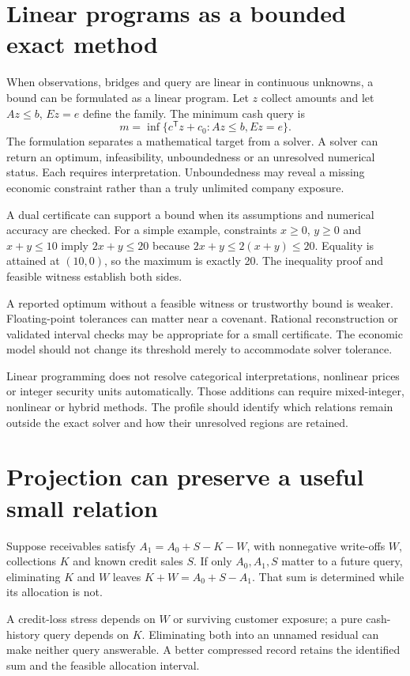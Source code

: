 \section{Linear programs as a bounded exact method}
When observations, bridges and query are linear in continuous unknowns, a bound can be formulated as a linear program. Let $z$ collect amounts and let $Az\leq b$, $Ez=e$ define the family. The minimum cash query is
\begin{equation}
 m=\inf\{c^{\mathsf T}z+c_0:Az\leq b, Ez=e\}.
\end{equation}
The formulation separates a mathematical target from a solver. A solver can return an optimum, infeasibility, unboundedness or an unresolved numerical status. Each requires interpretation. Unboundedness may reveal a missing economic constraint rather than a truly unlimited company exposure.

A dual certificate can support a bound when its assumptions and numerical accuracy are checked. For a simple example, constraints $x\geq0$, $y\geq0$ and $x+y\leq10$ imply $2x+y\leq20$ because $2x+y\leq2(x+y)\leq20$. Equality is attained at $(10,0)$, so the maximum is exactly 20. The inequality proof and feasible witness establish both sides.

A reported optimum without a feasible witness or trustworthy bound is weaker. Floating-point tolerances can matter near a covenant. Rational reconstruction or validated interval checks may be appropriate for a small certificate. The economic model should not change its threshold merely to accommodate solver tolerance.

Linear programming does not resolve categorical interpretations, nonlinear prices or integer security units automatically. Those additions can require mixed-integer, nonlinear or hybrid methods. The profile should identify which relations remain outside the exact solver and how their unresolved regions are retained.

\section{Projection can preserve a useful small relation}
Suppose receivables satisfy $A_1=A_0+S-K-W$, with nonnegative write-offs $W$, collections $K$ and known credit sales $S$. If only $A_0,A_1,S$ matter to a future query, eliminating $K$ and $W$ leaves $K+W=A_0+S-A_1$. That sum is determined while its allocation is not.

A credit-loss stress depends on $W$ or surviving customer exposure; a pure cash-history query depends on $K$. Eliminating both into an unnamed residual can make neither query answerable. A better compressed record retains the identified sum and the feasible allocation interval.

